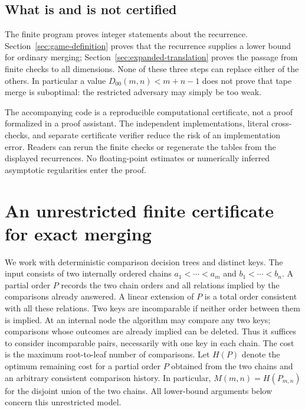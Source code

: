 \documentclass[11pt]{article}
\theoremstyle{definition}
\theoremstyle{remark}
\begin{document}
\subsection{What is and is not certified}
The finite program proves integer statements about the recurrence.
Section~\ref{sec:game-definition} proves that the recurrence supplies a
lower bound for ordinary merging; Section~\ref{sec:expanded-translation}
proves the passage from finite checks to all dimensions. None of these
three steps can replace either of the others. In particular a value
$D_{00}(m,n)<m+n-1$ does not prove that tape merge is suboptimal: the
restricted adversary may simply be too weak.

The accompanying code is a reproducible computational certificate, not a
proof formalized in a proof assistant. The independent implementations,
literal cross-checks, and separate certificate verifier reduce the risk of
an implementation error. Readers can rerun the finite checks or regenerate
the tables from the displayed recurrences. No floating-point estimates or
numerically inferred asymptotic regularities enter the proof.


\section{An unrestricted finite certificate for exact merging}
\label{ex:section}

We work with deterministic comparison decision trees and distinct keys.
The input consists of two internally ordered chains
$a_1<\cdots<a_m$ and $b_1<\cdots<b_n$.
A partial order $P$ records the two chain orders and all relations implied
by the comparisons already answered. A linear extension of $P$ is a total
order consistent with all these relations. Two keys are incomparable if
neither order between them is implied. At an internal node the algorithm may compare any two keys; comparisons whose
outcomes are already implied can be deleted.  Thus it suffices to consider
incomparable pairs, necessarily with one key in each chain.  The cost is the
maximum root-to-leaf number of comparisons.  Let $H(P)$ denote the optimum
remaining cost for a partial order $P$ obtained from the two chains and an
arbitrary consistent comparison history.  In particular,
$M(m,n)=H(P_{m,n})$ for the disjoint union of the two chains.
All lower-bound arguments below concern this unrestricted model.
\end{document}
